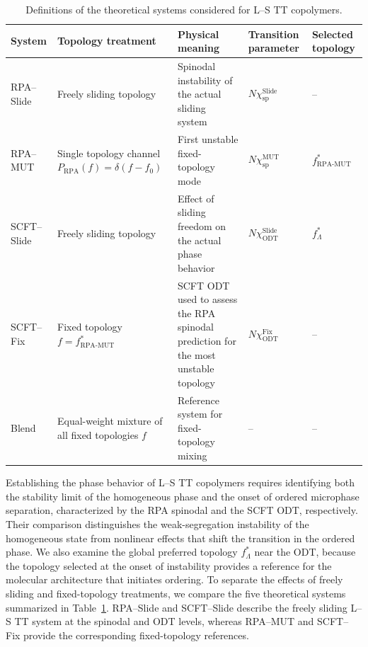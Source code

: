 \begin{table}[htbp]
	\centering
	\small
	\renewcommand{\arraystretch}{1.37}
	\caption{
		Definitions of the theoretical systems considered for L--S TT copolymers.
	}
	\begin{tabular}{
		>{\centering\arraybackslash}m{2.3cm}
		>{\raggedright\arraybackslash}m{3.0cm}
		>{\raggedright\arraybackslash}m{5.0cm}
		>{\centering\arraybackslash}m{2.0cm}
		>{\centering\arraybackslash}m{2.0cm}
	}
		\toprule
		System & Topology treatment & Physical meaning & Transition parameter & Selected topology \\
		\midrule
        
		RPA--Slide & Freely sliding topology & Spinodal instability of the actual sliding system & $N\chi_{\mathrm{sp}}^{\mathrm{Slide}}$ & -- \\
        
		RPA--MUT & Single topology channel $P_{\mathrm{RPA}}(f)=\delta(f-f_0)$ & First unstable fixed-topology mode & $N\chi_{\mathrm{sp}}^{\mathrm{MUT}}$ & $f_{\mathrm{RPA\text{-}MUT}}^\ast$ \\
        
		SCFT--Slide & Freely sliding topology & Effect of sliding freedom on the actual phase behavior & $N\chi_{\mathrm{ODT}}^{\mathrm{Slide}}$ & $f_{\Lambda}^{\ast}$ \\
        
		SCFT--Fix & Fixed topology $f=f_{\mathrm{RPA\text{-}MUT}}^\ast$ & SCFT ODT used to assess the RPA spinodal prediction for the most unstable topology & $N\chi_{\mathrm{ODT}}^{\mathrm{Fix}}$ & -- \\
        
		Blend & Equal-weight mixture of all fixed topologies $f$ & Reference system for fixed-topology mixing & -- & -- \\

		\bottomrule
	\end{tabular}
	\label{tab:TheoryModels}
\end{table}



Establishing the phase behavior of L--S TT copolymers requires identifying both the stability limit of the homogeneous phase and the onset of ordered microphase separation, characterized by the RPA spinodal and the SCFT ODT, respectively.
Their comparison distinguishes the weak-segregation instability of the homogeneous state from nonlinear effects that shift the transition in the ordered phase.\cite{Matsen1996Unifying,Sides2004Continuous,Wang2008Microphase,Li2020Largely,Li2021Simplicity}
We also examine the global preferred topology $f_\Lambda^\ast$ near the ODT, because the topology selected at the onset of instability provides a reference for the molecular architecture that initiates ordering.
To separate the effects of freely sliding and fixed-topology treatments, we compare the five theoretical systems summarized in Table~\ref{tab:TheoryModels}.
RPA--Slide and SCFT--Slide describe the freely sliding L--S TT system at the spinodal and ODT levels, whereas RPA--MUT and SCFT--Fix provide the corresponding fixed-topology references.

